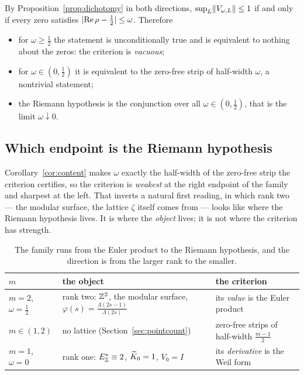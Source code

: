 \begin{corollary}\label{cor:content}
By Proposition~\ref{prop:dichotomy} in both directions,
$\sup_L\lVert V_{\omega,L}\rVert\le1$ if and only if every zero satisfies
$\lvert\operatorname{Re}\rho-\frac12\rvert\le\omega$. Therefore
\begin{itemize}
\item for $\omega\ge\frac12$ the statement is unconditionally true and is
 equivalent to nothing about the zeros: the criterion is \emph{vacuous};
\item for $\omega\in(0,\frac12)$ it is equivalent to the zero-free strip of
 half-width $\omega$, a nontrivial statement;
\item the Riemann hypothesis is the conjunction over all $\omega\in(0,\frac12)$,
 that is the limit $\omega\downarrow0$.
\end{itemize}
\end{corollary}

\subsection{Which endpoint is the Riemann hypothesis}\label{sec:endpoints}

Corollary~\ref{cor:content} makes $\omega$ exactly the half-width of the
zero-free strip the criterion certifies, so the criterion is \emph{weakest} at
the right endpoint of the family and sharpest at the left. That inverts a natural
first reading, in which rank two --- the modular surface, the lattice $\zeta$
itself comes from --- looks like where the Riemann hypothesis lives. It is where
the \emph{object} lives; it is not where the criterion has strength.

\begin{table}[ht]\centering\small
\caption{The family runs from the Euler product to the Riemann hypothesis, and
the direction is from the larger rank to the smaller.}\label{tab:endpoints}
\begin{tabular}{@{}lll@{}}
\toprule
$m$ & the object & the criterion\\
\midrule
$m=2$, $\omega=\frac12$ & rank two: $\mathbb Z^{2}$, the modular surface,
$\varphi(s)=\frac{\Lambda(2s-1)}{\Lambda(2s)}$ & its \emph{value} is the Euler product\\
$m\in(1,2)$ & no lattice (Section~\ref{sec:pointcount}) & zero-free strips of half-width $\frac{m-1}2$\\
$m=1$, $\omega=0$ & rank one: $E^{*}_{\mathbb Z}\equiv2$, $\widetilde K_0=1$, $V_0=I$ & its \emph{derivative} is the Weil form\\
\bottomrule
\end{tabular}
\end{table}


